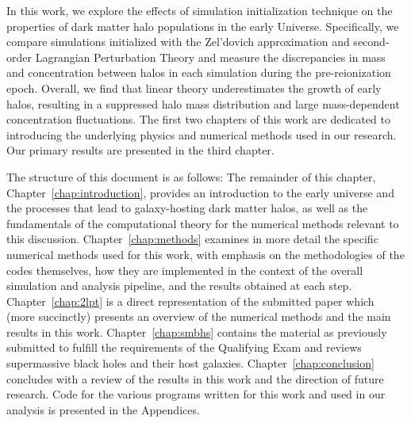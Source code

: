 
%
%
%
%


In this work, we explore the effects of simulation initialization technique on the properties of dark matter halo populations in the early Universe.  Specifically, we compare simulations initialized with the Zel'dovich approximation and second-order Lagrangian Perturbation Theory and measure the discrepancies in mass and concentration between halos in each simulation during the pre-reionization epoch.  Overall, we find that linear theory underestimates the growth of early halos, resulting in a suppressed halo mass distribution and large mass-dependent concentration fluctuations.  The first two chapters of this work are dedicated to introducing the underlying physics and numerical methods used in our research.  Our primary results are presented in the third chapter.

The structure of this document is as follows:  The remainder of this chapter, Chapter~\ref{chap:introduction}, provides an introduction to the early universe and the processes that lead to galaxy-hosting dark matter halos, as well as the fundamentals of the computational theory for the numerical methods relevant to this discussion.  Chapter~\ref{chap:methods} examines in more detail the specific numerical methods used for this work, with emphasis on the methodologies of the codes themselves, how they are implemented in the context of the overall simulation and analysis pipeline, and the results obtained at each step.  Chapter~\ref{chap:2lpt} is a direct representation of the submitted paper which (more succinctly) presents an overview of the numerical methods and the main results in this work.  Chapter~\ref{chap:smbhs} contains the material as previously submitted to fulfill the requirements of the Qualifying Exam and reviews supermassive black holes and their host galaxies.  Chapter~\ref{chap:conclusion} concludes with a review of the results in this work and the direction of future research.  Code for the various programs written for this work and used in our analysis is presented in the Appendices.





